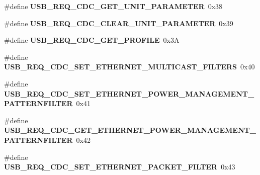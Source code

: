 \begin{DoxyCompactItemize}
\item 
\hypertarget{group__cdc__protocol__group_gaa1dbd05f95ee9fa9b0a18c3baaf70510}{\#define {\bfseries U\-S\-B\-\_\-\-R\-E\-Q\-\_\-\-C\-D\-C\-\_\-\-G\-E\-T\-\_\-\-U\-N\-I\-T\-\_\-\-P\-A\-R\-A\-M\-E\-T\-E\-R}~0x38}\label{group__cdc__protocol__group_gaa1dbd05f95ee9fa9b0a18c3baaf70510}

\item 
\hypertarget{group__cdc__protocol__group_ga27d474737f5224baecff3f702aea647c}{\#define {\bfseries U\-S\-B\-\_\-\-R\-E\-Q\-\_\-\-C\-D\-C\-\_\-\-C\-L\-E\-A\-R\-\_\-\-U\-N\-I\-T\-\_\-\-P\-A\-R\-A\-M\-E\-T\-E\-R}~0x39}\label{group__cdc__protocol__group_ga27d474737f5224baecff3f702aea647c}

\item 
\hypertarget{group__cdc__protocol__group_ga4f0045336cd0d38e988a424bbcb8fce3}{\#define {\bfseries U\-S\-B\-\_\-\-R\-E\-Q\-\_\-\-C\-D\-C\-\_\-\-G\-E\-T\-\_\-\-P\-R\-O\-F\-I\-L\-E}~0x3\-A}\label{group__cdc__protocol__group_ga4f0045336cd0d38e988a424bbcb8fce3}

\item 
\hypertarget{group__cdc__protocol__group_ga68617aa6e12d072222b232ab71f9e226}{\#define {\bfseries U\-S\-B\-\_\-\-R\-E\-Q\-\_\-\-C\-D\-C\-\_\-\-S\-E\-T\-\_\-\-E\-T\-H\-E\-R\-N\-E\-T\-\_\-\-M\-U\-L\-T\-I\-C\-A\-S\-T\-\_\-\-F\-I\-L\-T\-E\-R\-S}~0x40}\label{group__cdc__protocol__group_ga68617aa6e12d072222b232ab71f9e226}

\item 
\hypertarget{group__cdc__protocol__group_ga43abcd76b528dfc9cf1efbf3ba37bab0}{\#define {\bfseries U\-S\-B\-\_\-\-R\-E\-Q\-\_\-\-C\-D\-C\-\_\-\-S\-E\-T\-\_\-\-E\-T\-H\-E\-R\-N\-E\-T\-\_\-\-P\-O\-W\-E\-R\-\_\-\-M\-A\-N\-A\-G\-E\-M\-E\-N\-T\-\_\-\-P\-A\-T\-T\-E\-R\-N\-F\-I\-L\-T\-E\-R}~0x41}\label{group__cdc__protocol__group_ga43abcd76b528dfc9cf1efbf3ba37bab0}

\item 
\hypertarget{group__cdc__protocol__group_ga4bcd264cbcf653c18532ed313b818ee5}{\#define {\bfseries U\-S\-B\-\_\-\-R\-E\-Q\-\_\-\-C\-D\-C\-\_\-\-G\-E\-T\-\_\-\-E\-T\-H\-E\-R\-N\-E\-T\-\_\-\-P\-O\-W\-E\-R\-\_\-\-M\-A\-N\-A\-G\-E\-M\-E\-N\-T\-\_\-\-P\-A\-T\-T\-E\-R\-N\-F\-I\-L\-T\-E\-R}~0x42}\label{group__cdc__protocol__group_ga4bcd264cbcf653c18532ed313b818ee5}

\item 
\hypertarget{group__cdc__protocol__group_ga7d4e4730f093e5af9870351470093562}{\#define {\bfseries U\-S\-B\-\_\-\-R\-E\-Q\-\_\-\-C\-D\-C\-\_\-\-S\-E\-T\-\_\-\-E\-T\-H\-E\-R\-N\-E\-T\-\_\-\-P\-A\-C\-K\-E\-T\-\_\-\-F\-I\-L\-T\-E\-R}~0x43}\label{group__cdc__protocol__group_ga7d4e4730f093e5af9870351470093562}


\end{DoxyCompactItemize}
